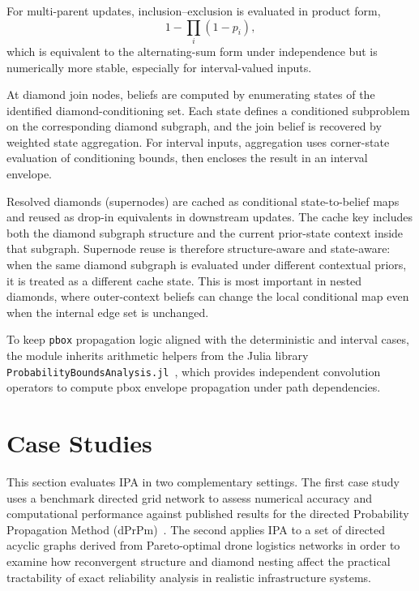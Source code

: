 \documentclass[preprint,12pt]{elsarticle}
\begin{document}
For multi-parent updates, inclusion--exclusion is evaluated in product form,
\[
1 - \prod_i (1 - p_i),
\]
which is equivalent to the alternating-sum form under independence but is numerically more stable, especially for interval-valued inputs.

At diamond join nodes, beliefs are computed by enumerating states of the identified diamond-conditioning set. Each state defines a conditioned subproblem on the corresponding diamond subgraph, and the join belief is recovered by weighted state aggregation. For interval inputs, aggregation uses corner-state evaluation of conditioning bounds, then encloses the result in an interval envelope.

Resolved diamonds (supernodes) are cached as conditional state-to-belief maps and reused as drop-in equivalents in downstream updates. The cache key includes both the diamond subgraph structure and the current prior-state context inside that subgraph. Supernode reuse is therefore structure-aware and state-aware: when the same diamond subgraph is evaluated under different contextual priors, it is treated as a different cache state. This is most important in nested diamonds, where outer-context beliefs can change the local conditional map even when the internal edge set is unchanged.

To keep \texttt{pbox} propagation logic aligned with the deterministic and interval cases, the module inherits arithmetic helpers from the Julia library \texttt{ProbabilityBoundsAnalysis.jl}~\cite{gray_probabilityboundsanalysis}, which provides independent convolution operators to compute pbox envelope propagation under path dependencies.



\clearpage  %
\section{Case Studies}
This section evaluates IPA in two complementary settings. The first case study uses a benchmark directed grid network to assess numerical accuracy and computational performance against published results for the directed Probability Propagation Method (dPrPm)~\cite{tong_probability_2019}. The second applies IPA to a set of directed acyclic graphs derived from Pareto-optimal drone logistics networks in order to examine how reconvergent structure and diamond nesting affect the practical tractability of exact reliability analysis in realistic infrastructure systems.
\end{document}
